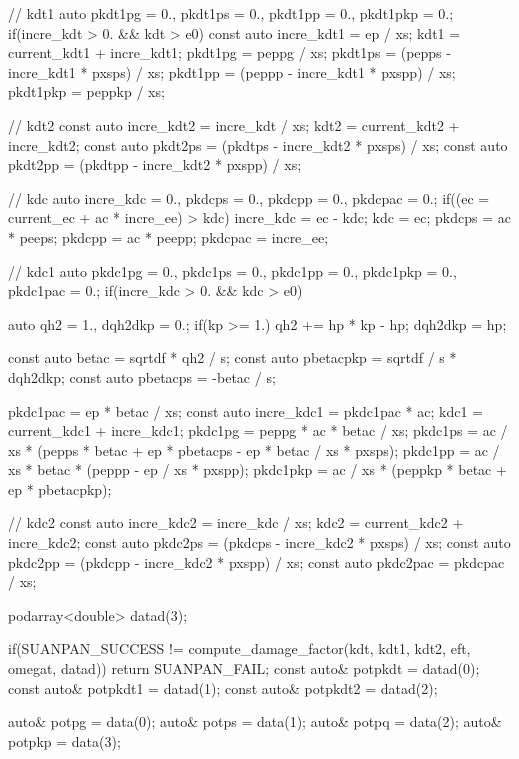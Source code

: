 \begin{cppcode}
{    // kdt1
    auto pkdt1pg = 0., pkdt1ps = 0., pkdt1pp = 0., pkdt1pkp = 0.;
    if(incre_kdt > 0. && kdt > e0) {
        const auto incre_kdt1 = ep / xs;
        kdt1 = current_kdt1 + incre_kdt1;
        pkdt1pg = peppg / xs;
        pkdt1ps = (pepps - incre_kdt1 * pxsps) / xs;
        pkdt1pp = (peppp - incre_kdt1 * pxspp) / xs;
        pkdt1pkp = peppkp / xs;
    }

    // kdt2
    const auto incre_kdt2 = incre_kdt / xs;
    kdt2 = current_kdt2 + incre_kdt2;
    const auto pkdt2ps = (pkdtps - incre_kdt2 * pxsps) / xs;
    const auto pkdt2pp = (pkdtpp - incre_kdt2 * pxspp) / xs;

    // kdc
    auto incre_kdc = 0., pkdcps = 0., pkdcpp = 0., pkdcpac = 0.;
    if((ec = current_ec + ac * incre_ee) > kdc) {
        incre_kdc = ec - kdc;
        kdc = ec;
        pkdcps = ac * peeps;
        pkdcpp = ac * peepp;
        pkdcpac = incre_ee;
    }

    // kdc1
    auto pkdc1pg = 0., pkdc1ps = 0., pkdc1pp = 0., pkdc1pkp = 0., pkdc1pac = 0.;
    if(incre_kdc > 0. && kdc > e0) {
        auto qh2 = 1., dqh2dkp = 0.;
        if(kp >= 1.) {
            qh2 += hp * kp - hp;
            dqh2dkp = hp;
        }

        const auto betac = sqrtdf * qh2 / s;
        const auto pbetacpkp = sqrtdf / s * dqh2dkp;
        const auto pbetacps = -betac / s;

        pkdc1pac = ep * betac / xs;
        const auto incre_kdc1 = pkdc1pac * ac;
        kdc1 = current_kdc1 + incre_kdc1;
        pkdc1pg = peppg * ac * betac / xs;
        pkdc1ps = ac / xs * (pepps * betac + ep * pbetacps - ep * betac / xs * pxsps);
        pkdc1pp = ac / xs * betac * (peppp - ep / xs * pxspp);
        pkdc1pkp = ac / xs * (peppkp * betac + ep * pbetacpkp);
    }

    // kdc2
    const auto incre_kdc2 = incre_kdc / xs;
    kdc2 = current_kdc2 + incre_kdc2;
    const auto pkdc2ps = (pkdcps - incre_kdc2 * pxsps) / xs;
    const auto pkdc2pp = (pkdcpp - incre_kdc2 * pxspp) / xs;
    const auto pkdc2pac = pkdcpac / xs;

    podarray<double> datad(3);

    if(SUANPAN_SUCCESS != compute_damage_factor(kdt, kdt1, kdt2, eft, omegat, datad)) return SUANPAN_FAIL;
    const auto& potpkdt = datad(0);
    const auto& potpkdt1 = datad(1);
    const auto& potpkdt2 = datad(2);

    auto& potpg = data(0);
    auto& potps = data(1);
    auto& potpq = data(2);
    auto& potpkp = data(3);

}
\end{cppcode}
